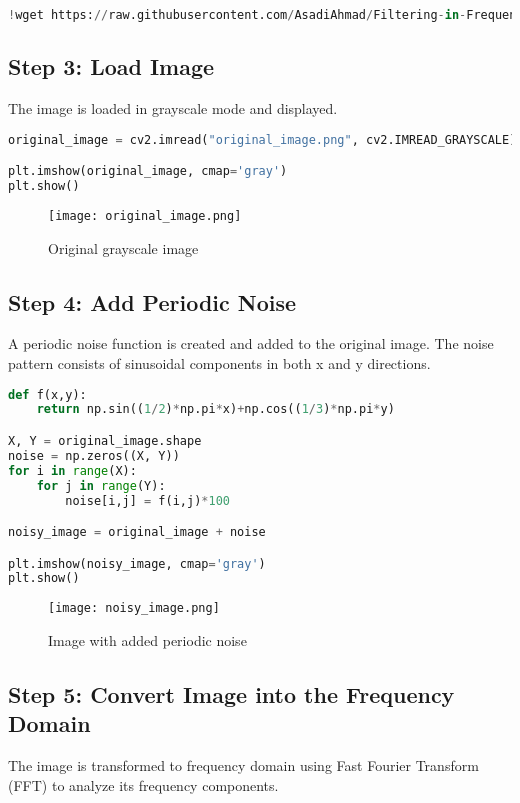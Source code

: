 \documentclass[12pt]{article}
\begin{document}
\begin{lstlisting}[language=Python]
!wget https://raw.githubusercontent.com/AsadiAhmad/Filtering-in-Frequency-Domain/main/Pictures/original_image.png -O original_image.png
\end{lstlisting}

\subsection{Step 3: Load Image}
The image is loaded in grayscale mode and displayed.

\begin{lstlisting}[language=Python]
original_image = cv2.imread("original_image.png", cv2.IMREAD_GRAYSCALE)

plt.imshow(original_image, cmap='gray')
plt.show()
\end{lstlisting}

\begin{figure}[h]
    \centering
    \texttt{[image: original\_image.png]}
    \caption{Original grayscale image}
\end{figure}

\subsection{Step 4: Add Periodic Noise}
A periodic noise function is created and added to the original image. The noise pattern consists of sinusoidal components in both x and y directions.

\begin{lstlisting}[language=Python]
def f(x,y):
    return np.sin((1/2)*np.pi*x)+np.cos((1/3)*np.pi*y)

X, Y = original_image.shape
noise = np.zeros((X, Y))
for i in range(X):
    for j in range(Y):
        noise[i,j] = f(i,j)*100

noisy_image = original_image + noise

plt.imshow(noisy_image, cmap='gray')
plt.show()
\end{lstlisting}

\begin{figure}[h]
    \centering
    \texttt{[image: noisy\_image.png]}
    \caption{Image with added periodic noise}
\end{figure}

\subsection{Step 5: Convert Image into the Frequency Domain}
The image is transformed to frequency domain using Fast Fourier Transform (FFT) to analyze its frequency components.
\end{document}
